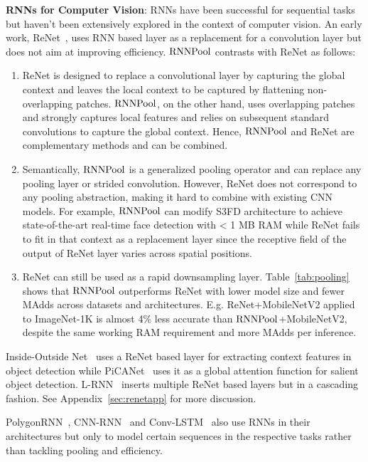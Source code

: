 \documentclass[10pt]{article}
\newcommand{\rpool}{\ensuremath{{\rm RNNPool}}\xspace}
\begin{document}
\textbf{RNNs for Computer Vision}:
\label{sec:renet}
RNNs have been successful for sequential tasks but haven't been
extensively explored in the context of computer vision. An early work,
ReNet~\citep{visin2015renet}, uses RNN based layer as a replacement
for a convolution layer but does not aim at improving
efficiency. \rpool contrasts with ReNet as follows:
\vspace{-1mm}
\begin{enumerate}[leftmargin=*, label=\alph*.]
    \itemsep 0pt
    \topsep 0pt
    \parskip 0pt
    \item ReNet is designed to replace a convolutional layer by
      capturing the global context and leaves the local context to be
      captured by flattening non-overlapping patches. \rpool, on the
      other hand, uses overlapping patches and strongly captures local
      features and relies on subsequent standard convolutions to
      capture the global context. Hence, \rpool and ReNet are
      complementary methods and can be combined.
    \item Semantically, \rpool is a generalized pooling operator and
      can replace any pooling layer or strided convolution. However,
      ReNet does not correspond to any pooling abstraction, making it
      hard to combine with existing CNN models. For example, \rpool
      can modify S3FD architecture to achieve state-of-the-art
      real-time face detection with < 1 MB RAM while ReNet fails to
      fit in that context as a replacement layer since the receptive
      field of the output of ReNet layer varies across spatial
      positions.
    \item ReNet can still be used as a rapid downsampling
      layer. Table~\ref{tab:pooling} shows that \rpool outperforms
      ReNet with lower model size and fewer MAdds across datasets and
      architectures. E.g. ReNet+MobileNetV2 applied to ImageNet-1K is
      almost 4\% less accurate than \rpool+MobileNetV2, despite the
      same working RAM requirement and more MAdds per inference.
\end{enumerate}
\vspace{-1mm}
Inside-Outside Net~\citep{Bell_2016_CVPR} uses a ReNet based layer for
extracting context features in object detection while
PiCANet~\citep{Liu_2018_CVPR} uses it as a global attention function
for salient object detection. L-RNN~\citep{xie2016layer} inserts
multiple ReNet based layers but in a cascading fashion. See
Appendix~\ref{sec:renetapp} for more discussion.

PolygonRNN~\citep{acuna2018efficient}, CNN-RNN~\citep{wang2016cnn} and
Conv-LSTM~\citep{xingjian2015convolutional} also use RNNs in their
architectures but only to model certain sequences in the respective
tasks rather than tackling pooling and efficiency.
\end{document}
